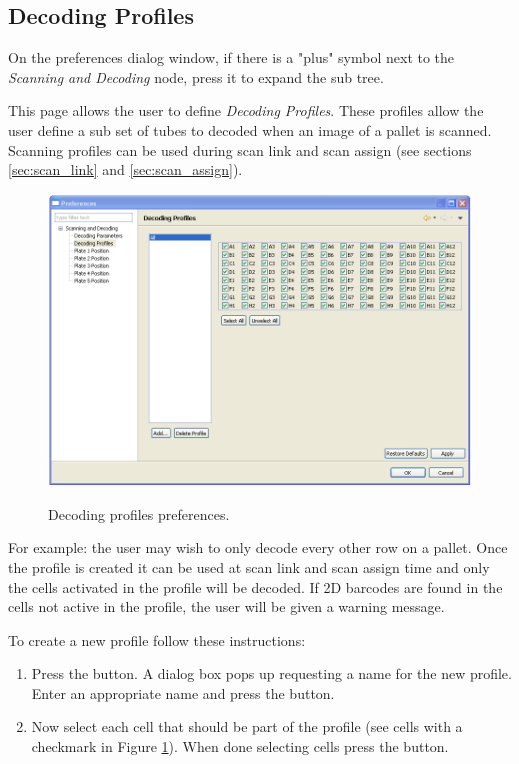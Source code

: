 \subsection{Decoding Profiles}
On the preferences dialog window, if there is a "plus" symbol next to the
\emph{Scanning and Decoding} node, press it to expand the sub tree.

This page allows the user to define \emph{Decoding Profiles}. These profiles
allow the user define a sub set of tubes to decoded when an image of a pallet
is scanned. Scanning profiles can be used during scan link and scan assign (see
sections \ref{sec:scan_link} and \ref{sec:scan_assign}).
    \begin{figure}[H]
      \centering
      \scalebox{0.45}
      { \includegraphics*{screenshots/configuration/prefs_decoding_profiles} }
      \caption{Decoding profiles preferences.}
      \label{fig:prefs_decoding_profiles}
    \end{figure}
For example: the user may wish to only decode every other row on a pallet. Once
the profile is created it can be used at scan link and scan assign time and
only the cells activated in the profile will be decoded. If 2D barcodes are
found in the cells not active in the profile, the user will be given a warning
message.

To create a new profile follow these instructions:
\begin{enumerate}
  \item Press the  button. A dialog box pops up requesting a name
    for the new profile. Enter an appropriate name and press the 
    button.
  \item Now select each cell that should be part of the profile (see cells with
    a checkmark in Figure \ref{fig:prefs_decoding_profiles}). When done
    selecting cells press the  button.
\end{enumerate}

